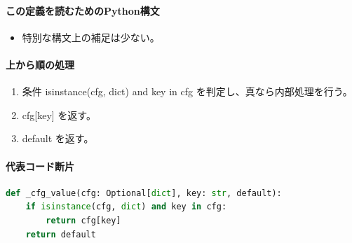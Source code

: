 \documentclass[a4paper,11pt]{article}
\begin{document}
            \paragraph{この定義を読むためのPython構文}
            \begin{itemize}[leftmargin=1.6em]
            \item 特別な構文上の補足は少ない。
            \end{itemize}
            \paragraph{上から順の処理}
            \begin{enumerate}[leftmargin=1.8em]
            \item 条件 isinstance(cfg, dict) and key in cfg を判定し、真なら内部処理を行う。
\item   cfg[key] を返す。
\item default を返す。
            \end{enumerate}
            \paragraph{代表コード断片}
            \begin{lstlisting}[language=Python]
def _cfg_value(cfg: Optional[dict], key: str, default):
    if isinstance(cfg, dict) and key in cfg:
        return cfg[key]
    return default
\end{lstlisting}
\end{document}
